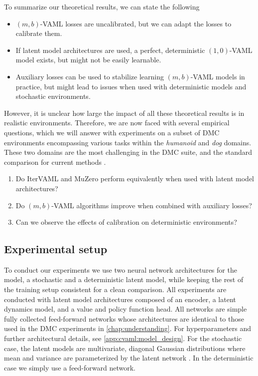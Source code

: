 To summarize our theoretical results, we can state the following
\begin{itemize}
    \item $(m,b)$-VAML losses are uncalibrated, but we can adapt the losses to calibrate them.
    \item If latent model architectures are used, a perfect, deterministic $(1,0)$-VAML model exists, but might not be easily learnable.
    \item Auxiliary losses can be used to stabilize learning $(m,b)$-VAML models in practice, but might lead to issues when used with deterministic models and stochastic environments.
\end{itemize}

However, it is unclear how large the impact of all these theoretical results is in realistic environments.
Therefore, we are now faced with several empirical questions, which we will answer with experiments on a subset of DMC environments \parencite{tunyasuvunakool2020dmcontrol} encompassing various tasks within the \textit{humanoid} and \textit{dog} domains.
These two domains are the most challenging in the DMC suite, and the standard comparison for current methods \parencite{voelcker2025mad,nauman2024bigger}.

\begin{enumerate}
    \item Do IterVAML and MuZero perform equivalently when used with latent model architectures?
    \item Do $(m,b)$-VAML algorithms improve when combined with auxiliary losses?
    \item Can we observe the effects of calibration on deterministic environments?
\end{enumerate}

\subsection{Experimental setup}

To conduct our experiments we use two neural network architectures for the model, a stochastic and a deterministic latent model, while keeping the rest of the training setup consistent for a clean comparison.
All experiments are conducted with latent model architectures composed of an encoder, a latent dynamics model, and a value and policy function head.
All networks are simple fully collected feed-forward networks whose architectures are identical to those used in the DMC experiments in \autoref{chap:understanding}.
For hyperparameters and further architectural details, see \autoref{app:cvaml:model_design}.
For the stochastic case, the latent models are multivariate, diagonal Gaussian distributions where mean and variance are parameterized by the latent network \parencite{pets,janner2019mbpo,paster2021blast}.
In the deterministic case we simply use a feed-forward network.
 
